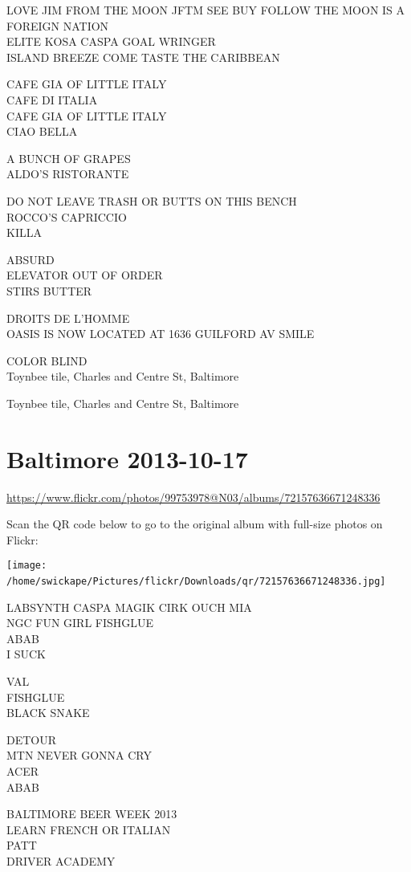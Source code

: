 \documentclass[10pt,letterpaper]{article}
\begin{document}
LOVE JIM FROM THE MOON JFTM SEE BUY FOLLOW THE MOON IS A FOREIGN NATION\\
ELITE KOSA CASPA GOAL WRINGER\\
ISLAND BREEZE COME TASTE THE CARIBBEAN

CAFE GIA OF LITTLE ITALY\\
CAFE DI ITALIA\\
CAFE GIA OF LITTLE ITALY\\
CIAO BELLA

A BUNCH OF GRAPES\\
ALDO'S RISTORANTE

DO NOT LEAVE TRASH OR BUTTS ON THIS BENCH\\
ROCCO'S CAPRICCIO\\
KILLA

ABSURD\\
ELEVATOR OUT OF ORDER\\
STIRS BUTTER

DROITS DE L'HOMME\\
OASIS IS NOW LOCATED AT 1636 GUILFORD AV SMILE

COLOR BLIND\\
Toynbee tile, Charles and Centre St, Baltimore

Toynbee tile, Charles and Centre St, Baltimore
\

\section*{Baltimore 2013-10-17}

\url{https://www.flickr.com/photos/99753978@N03/albums/72157636671248336}

Scan the QR code below to go to the original album with full-size photos on Flickr:

\texttt{[image: /home/swickape/Pictures/flickr/Downloads/qr/72157636671248336.jpg]}
\

LABSYNTH CASPA MAGIK CIRK OUCH MIA\\
NGC FUN GIRL FISHGLUE\\
ABAB\\
I SUCK

VAL\\
FISHGLUE\\
BLACK SNAKE

DETOUR\\
MTN NEVER GONNA CRY\\
ACER\\
ABAB

BALTIMORE BEER WEEK 2013\\
LEARN FRENCH OR ITALIAN\\
PATT\\
DRIVER ACADEMY
\end{document}
